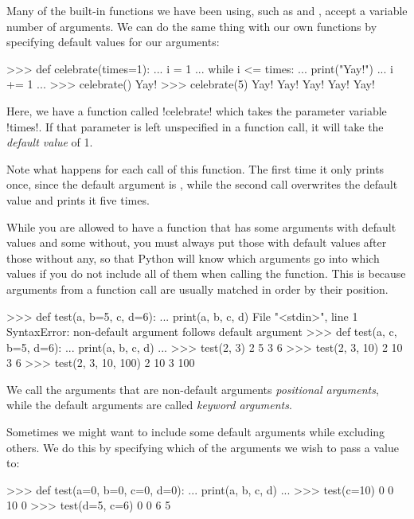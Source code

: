 \documentclass[11pt]{cselabheader}
\begin{document}
Many of the built-in functions we have been using, such as 
and , accept a variable number of arguments. We can do the
same thing with our own functions by specifying default values for our
arguments:

\begin{pyconcode}
>>> def celebrate(times=1):
...     i = 1
...     while i <= times:
...         print("Yay!")
...         i += 1
...
>>> celebrate()
Yay!
>>> celebrate(5)
Yay!
Yay!
Yay!
Yay!
Yay!
\end{pyconcode}

Here, we have a function called \pythoninline!celebrate! which takes the
parameter variable \pythoninline!times!. If that parameter is left unspecified
in a function call, it will take the \emph{default value} of 1.

Note what happens for each call of this function. The first time it only prints
 once, since the default argument is ,
while the second call overwrites the default value and prints it five times.

While you are allowed to have a function that has some arguments with default
values and some without, you must always put those with default values after
those without any, so that Python will know which arguments go into which values
if you do not include all of them when calling the function. This is because
arguments from a function call are usually matched in order by their position.

\begin{pyconcode}
>>> def test(a, b=5, c, d=6):
...     print(a, b, c, d)
  File "<stdin>", line 1
SyntaxError: non-default argument follows default argument
>>> def test(a, c, b=5, d=6):
...     print(a, b, c, d)
...
>>> test(2, 3)
2 5 3 6
>>> test(2, 3, 10)
2 10 3 6
>>> test(2, 3, 10, 100)
2 10 3 100
\end{pyconcode}

We call the arguments that are non-default arguments \emph{positional
arguments}, while the default arguments are called \emph{keyword arguments}.

Sometimes we might want to include some default arguments while excluding
others. We do this by specifying which of the arguments we wish to pass a value
to:

\begin{pyconcode}
>>> def test(a=0, b=0, c=0, d=0):
...     print(a, b, c, d)
...
>>> test(c=10)
0 0 10 0
>>> test(d=5, c=6)
0 0 6 5
\end{pyconcode}
\end{document}
